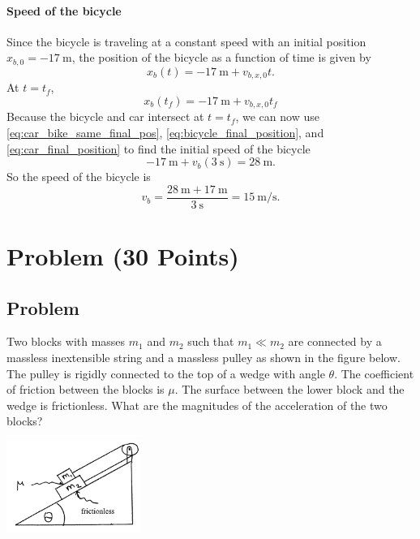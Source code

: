 \documentclass[solutions]{esg8012exam}
\begin{document}
    \paragraph{Speed of the bicycle}
      Since the bicycle is traveling at a constant speed with an initial position $x_{b,0} = -\SI{17}{\meter}$, the position of the bicycle as a function of time is given by
      $$x_b(t) = -\SI{17}{\meter} + v_{b,x,0}t.$$
      At $t = t_f$,
      \begin{equation}
        x_b(t_f) = -\SI{17}{\meter} + v_{b,x,0}t_f \label{eq:bicycle_final_position}
      \end{equation}
      Because the bicycle and car intersect at $t = t_f$, we can now use \autoref{eq:car_bike_same_final_pos}, \autoref{eq:bicycle_final_position}, and \autoref{eq:car_final_position} to find the initial speed of the bicycle
      $$-\SI{17}{\meter} + v_b(\SI{3}{\second}) = \SI{28}{\meter}.$$
      So the speed of the bicycle is
      $$v_b = \frac{\SI{28}{\meter} + \SI{17}{\meter}}{\SI{3}{\second}} = \SI{15}{\meter\per\second}.$$
\clearpage
\section{Problem \thesection\space(30 Points)}
\subsection{Problem}
  Two blocks with masses $m_1$ and $m_2$ such that $m_1 \ll m_2$ are connected by a massless inextensible string and a massless pulley as shown in the figure below.  The pulley is rigidly connected to the top of a wedge with angle $\theta$.  The coefficient of friction between the blocks is $\mu$.  The surface between the lower block and the wedge is frictionless.  What are the magnitudes of the acceleration of the two blocks?
  \begin{center}\includegraphics[width=0.33\textwidth]{exam1_p2_1}\end{center}
\end{document}
